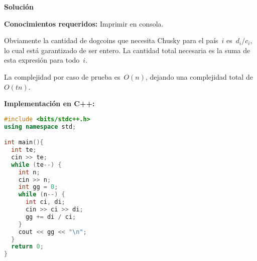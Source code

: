 \vspace*{0cm}
{\Large\textbf{Solución}}

\textbf{Conocimientos requeridos:} Imprimir en consola.

Obviamente la cantidad de dogcoins que necesita Chusky para el país~$i$
es~$d_i / c_i$, lo cual está garantizado de ser entero. La cantidad total necesaria
es la suma de esta expresión para todo~$i$.

La complejidad por caso de prueba es~$O(n)$, dejando una complejidad total
de~$O(t n)$.

\textbf{Implementación en C++:}

\begin{lstlisting}[language=C++]
#include <bits/stdc++.h>
using namespace std;

int main(){
  int te;
  cin >> te;
  while (te--) {
    int n;
    cin >> n;
    int gg = 0;
    while (n--) {
      int ci, di;
      cin >> ci >> di;
      gg += di / ci;
    }
    cout << gg << "\n";
  }
  return 0;
}
\end{lstlisting}

\newpage

